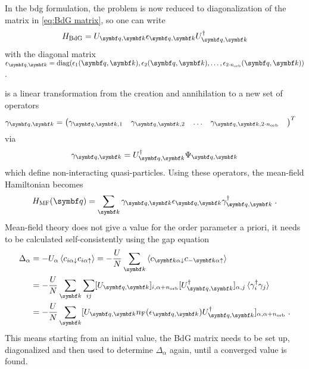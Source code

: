 \documentclass[../main.tex]{subfiles}
\begin{document}
In the \gls{bdg} formulation, the problem is now reduced to diagonalization of the matrix in \cref{eq:BdG matrix}, so one can write
\begin{equation}
	H_{\mathrm{BdG}} = U_{\vb{q}, \vb{k}} \epsilon_{\vb{q}, \vb{k}} U_{\vb{q}, \vb{k}}^{\dagger}
	\label{eq:BdG Hamiltonian diagonalized}
\end{equation}
with the diagonal matrix \(\epsilon_{\vb{q}, \vb{k}} = \diag(\epsilon_1 (\vb{q}, \vb{k}), \epsilon_2 (\vb{q}, \vb{k}), \ldots, \epsilon_{2 \cdot n_{\mathrm{orb}}} (\vb{q}, \vb{k}))\).

 is a linear transformation from the creation and annihilation to a new set of operators
\begin{align}
	\gamma_{\vb{q}, \vb{k}} &= 
	\begin{pmatrix}
		\gamma_{\vb{q}, \vb{k},  1} &
		\gamma_{\vb{q}, \vb{k},  2} & 
		\ldots &
		\gamma_{\vb{q}, \vb{k},  2 \cdot n_{\mathrm{orb}}} & 
	\end{pmatrix}^{T}
\end{align}
via
\begin{equation}
	\gamma_{\vb{q}, \vb{k}} = U_{\vb{q}, \vb{k}}^{\dagger} \Psi_{\vb{q}, \vb{k}}
\end{equation}
which define non-interacting quasi-particles.
Using these operators, the mean-field Hamiltonian becomes
\begin{equation}
	H_{\mathrm{MF}} (\vb{q}) = \sum_{\vb{k}} \gamma_{\vb{q}, \vb{k}} \epsilon_{\vb{q}, \vb{k}} \gamma_{\vb{q}, \vb{k}}^{\dagger} \;.
\end{equation}
Mean-field theory does not give a value for the order parameter a priori, it needs to be calculated self-consistently using the gap equation
\begin{align}
	\Delta_{\alpha} &= -U_{\alpha} \braket{c_{i \alpha \downarrow} c_{i \alpha \uparrow}} = -\frac{U}{N} \sum_{\vb{k}} \braket{c_{\vb{k} \alpha \downarrow} c_{-\vb{k} \alpha \uparrow}} \nonumber \\
	&= -\frac{U}{N} \sum_{\vb{k}} \sum_{ij} [U_{\vb{q}, \vb{k}}]_{i, \alpha + n_{\mathrm{orb}}} [U_{\vb{q}, \vb{k}}^{\dagger}]_{\alpha, j} \braket{\gamma_i^{\dagger} \gamma_j} \label{eq:gap equation} \\
	&= -\frac{U}{N} \sum_{\vb{k}} [U_{\vb{q}, \vb{k}} n_{\mathrm{F}} (\epsilon_{\vb{q}, \vb{k}}) U_{\vb{q}, \vb{k}}^{\dagger}]_{\alpha, \alpha + n_{\mathrm{orb}}} \nonumber \;.
\end{align}
This means starting from an initial value, the BdG matrix needs to be set up, diagonalized and then used to determine \(\Delta_{\alpha}\) again, until a converged value is found.
\end{document}
